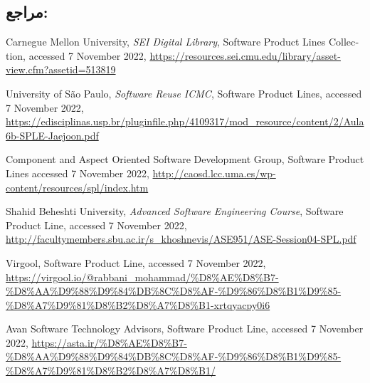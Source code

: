 {\begin{enumerate}
\end{enumerate}

\subsection*{مراجع:}

\begin{latin}
	\begingroup
	\renewcommand{\section}[2]{}%
	
\begin{thebibliography}{9}

	Carnegue Mellon University,
	\textit{SEI Digital Library},
	Software Product Lines Collection, 
	accessed 7 November 2022,
	\url{https://resources.sei.cmu.edu/library/asset-view.cfm?assetid=513819}
	
	University of São Paulo,
	\textit{Software Reuse ICMC},
	Software Product Lines, 
	accessed 7 November 2022,
	\url{https://edisciplinas.usp.br/pluginfile.php/4109317/mod_resource/content/2/Aula6b-SPLE-Jaejoon.pdf}
	
	Component and Aspect Oriented Software Development Group,
	Software Product Lines
	accessed 7 November 2022,
	\url{http://caosd.lcc.uma.es/wp-content/resources/spl/index.htm}
	
	Shahid Beheshti University,
	\textit{Advanced Software Engineering Course},
	Software Product Line, 
	accessed 7 November 2022,
	\url{http://facultymembers.sbu.ac.ir/s_khoshnevis/ASE951/ASE-Session04-SPL.pdf}

	Virgool,
	Software Product Line, 
	accessed 7 November 2022,
	\url{https://virgool.io/@rabbani\_mohammad/\%D8\%AE\%D8\%B7-\%D8\%AA\%D9\%88\%D9\%84\%DB\%8C\%D8\%AF-\%D9\%86\%D8\%B1\%D9\%85-\%D8\%A7\%D9\%81\%D8\%B2\%D8\%A7\%D8\%B1-xrtqyacpy0i6}
	
	Avan Software Technology Advisors,
	Software Product Line, 
	accessed 7 November 2022,
	\url{https://asta.ir/\%D8\%AE\%D8\%B7-\%D8\%AA\%D9\%88\%D9\%84\%DB\%8C\%D8\%AF-\%D9\%86\%D8\%B1\%D9\%85-\%D8\%A7\%D9\%81\%D8\%B2\%D8\%A7\%D8\%B1/}
	
	
\end{thebibliography}
\endgroup
\end{latin}

}